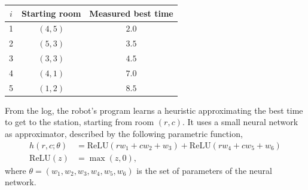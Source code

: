 \documentclass[11pt, a4paper]{exam}
\newcommand{\ReLU}{\mathrm{ReLU}}
\begin{document}
\begin{exercises}
\begin{center}
    \begin{tabular}{ccc}
        \toprule
        $i$ & Starting room & Measured best time \\
        \midrule
        1 & $(4, 5)$ & $2.0$ \\
        2 & $(5, 3)$ & $3.5$ \\
        3 & $(3, 3)$ & $4.5$ \\
        4 & $(4, 1)$ & $7.0$ \\
        5 & $(1, 2)$ & $8.5$ \\
        \bottomrule
    \end{tabular}
\end{center}

From the log, the robot's program learns a heuristic approximating the best time to get to the station, starting from room $(r, c)$. It uses a small neural network as approximator, described by the following parametric function,
\begin{align*}
    h(r, c; \theta) & = \ReLU(r w_1 + c w_2 + w_3) + \ReLU(r w_4 + c w_5 + w_6) \\
    \ReLU(z) & = \max(z, 0) ,
\end{align*}
where $\theta = (w_1, w_2, w_3, w_4, w_5, w_6)$ is the set of parameters of the neural network.

\end{exercises}
\end{document}
